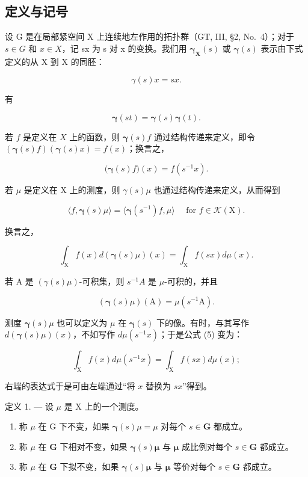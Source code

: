 \subsection{定义与记号}

设 G 是在局部紧空间 X 上连续地左作用的拓扑群（GT, III, §2, No.~4）；对于 \(s \in G\) 和 \(x \in X\)，记 sx 为 s 对 x 的变换。我们用 \(\boldsymbol{\gamma}_{\mathbf{X}}(s)\) 或 \(\boldsymbol{\gamma}(s)\) 表示由下式定义的从 X 到 X 的同胚：

\[
\gamma (s) x = s x.\tag{1}
\]

有

\[
\boldsymbol {\gamma} (s t) = \boldsymbol {\gamma} (s) \boldsymbol {\gamma} (t).\tag{2}
\]

若 \(f\) 是定义在 \(X\) 上的函数，则 \(\boldsymbol{\gamma}(s)f\) 通过结构传递来定义，即令 \((\boldsymbol{\gamma}(s)f)(\boldsymbol{\gamma}(s)x) = f(x)\)；换言之，

\[
\big (\boldsymbol {\gamma} (s) f \big) (x) = f (s ^ {- 1} x).\tag{3}
\]

若 \(\mu\) 是定义在 X 上的测度，则 \(\gamma(s)\mu\) 也通过结构传递来定义，从而得到

\[
\langle f, \boldsymbol {\gamma} (s) \mu \rangle = \langle \boldsymbol {\gamma} (s ^ {- 1}) f, \mu \rangle \quad \text {   for   } f \in \mathscr {K} (\mathrm{X}).\tag{4}
\]

换言之，

\[
\int_ {\mathrm{X}} f (x) d (\boldsymbol {\gamma} (s) \mu) (x) = \int_ {\mathrm{X}} f (s x) d \mu (x).\tag{5}
\]

若 A 是 \((\gamma(s)\mu)\)-可积集，则 \(s^{-1}A\) 是 \(\mu\)-可积的，并且

\[
\left(\boldsymbol {\gamma} (s) \mu\right) (\mathrm{A}) = \mu \left(s ^ {- 1} \mathrm{A}\right).\tag{6}
\]

测度 \(\boldsymbol{\gamma}(s)\mu\) 也可以定义为 \(\mu\) 在 \(\boldsymbol{\gamma}(s)\) 下的像。有时，与其写作 \(d(\boldsymbol{\gamma}(s)\mu)(x)\)，不如写作 \(d\mu(s^{-1}x)\)；于是公式 (5) 变为：

\[
\int_ {\mathrm{X}} f (x) d \mu (s ^ {- 1} x) = \int_ {\mathrm{X}} f (s x) d \mu (x);
\]

右端的表达式于是可由左端通过“将 \(x\) 替换为 \(sx\)”得到。

定义 1. --- 设 \(\mu\) 是 X 上的一个测度。

\begin{enumerate}
\def\labelenumi{\alph{enumi})}
\item
  称 \(\mu\) 在 G 下不变，如果 \(\pmb{\gamma}(s)\mu = \mu\) 对每个 \(s\in \mathbf{G}\) 都成立。
\item
  称 \(\mu\) 在 \(\mathbf{G}\) 下相对不变，如果 \(\pmb{\gamma}(s)\pmb{\mu}\) 与 \(\pmb{\mu}\) 成比例对每个 \(s\in \mathbf{G}\) 都成立。
\item
  称 \(\mu\) 在 \(\mathbf{G}\) 下拟不变，如果 \(\pmb{\gamma}(s)\pmb{\mu}\) 与 \(\pmb{\mu}\) 等价对每个 \(s\in \mathbf{G}\) 都成立。
\end{enumerate}

